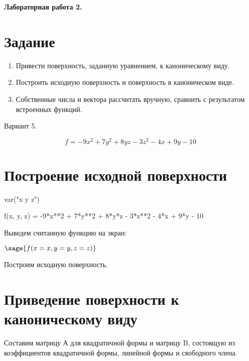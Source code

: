 \documentclass{article}
\author{Короткевич Л. В., М8О-208Б-19}
\begin{document}
\begin{center}
\Large{\textbf{Лабораторная работа 2.}}
\end{center}

\section{Задание}
\begin{enumerate}
\item Привести поверхность, заданную уравнением, к каноническому виду.
\item Построить исходную поверхность и поверхность в каноническом виде.
\item Собственные числа и вектора рассчитать вручную, сравнить с результатом встроенных функций.
\end{enumerate}

\begin{center}
Вариант 5.
\end{center}
$$f = -9x^2 + 7y^2 + 8yz - 3z^2 - 4x + 9y - 10$$

\section{Построение исходной поверхности}
\begin{sagesilent}
var("x y z")
\end{sagesilent}
\begin{sageblock}
f(x, y, z) = -9*x**2 + 7*y**2 + 8*y*z - 3*z**2 - 4*x + 9*y - 10
\end{sageblock}

Выведем считанную функцию на экран:

\begin{center}
$\sage{f(x=x, y=y, z=z)}$
\end{center}

Построим исходную поверхность.

\begin{center}
\end{center}

\section{Приведение поверхности к каноническому виду}
Составим матрицу А для квадратичной формы и матрицу B, состоящую из коэффициентов квадратичной формы, линейной формы и свободного члена.
\end{document}
